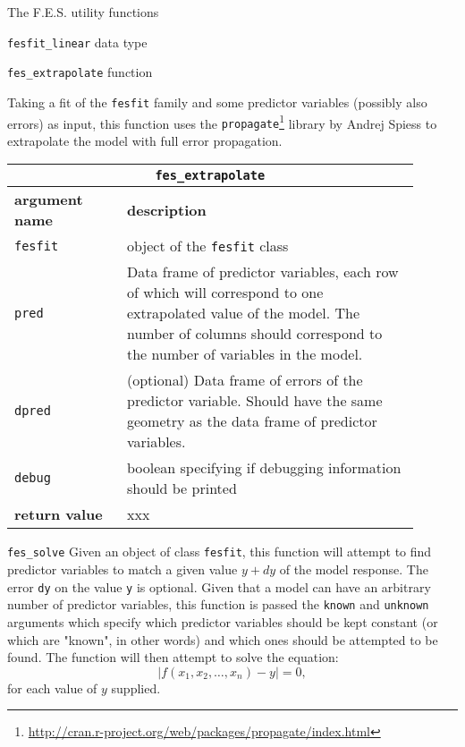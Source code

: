 \documentclass[10pt,a4paper]{article}
\begin{document}
\begin{section}{The F.E.S. utility functions}
\begin{subsection}{ {\tt fesfit\_linear} data type }
\end{subsection}

\begin{subsection}{ {\tt fes\_extrapolate} function }

Taking a fit of the {\tt fesfit} family and some predictor variables (possibly also errors) as input, this function uses the {\tt propagate}\footnote{\url{http://cran.r-project.org/web/packages/propagate/index.html}} library by Andrej Spiess to extrapolate the model with full error propagation.

{ \centering
\begin{tabular}{|p{0.25\linewidth}|p{0.65\linewidth}|}
\hline
\multicolumn{2}{|c|}{ {\tt fes\_extrapolate} } \\
\hline \hline \textbf{argument name} & \textbf{description} \\
\hline {\tt fesfit} & object of the {\tt fesfit} class \\ 
{\tt pred} & Data frame of predictor variables, each row of which will
correspond to one extrapolated value of the model. The number of columns should
correspond to the number of variables in the model. \\ 
{\tt dpred} & (optional) Data frame of errors of the predictor variable. Should
have the same geometry as the data frame of predictor variables. \\ 
{\tt debug} & boolean specifying if debugging information should be printed \\
\hline \hline
\textbf{return value} & xxx \\
\hline
\end{tabular}
}

\end{subsection}

\begin{subsection}{ {\tt fes\_solve} }
Given an object of class {\tt fesfit}, this function will attempt to find predictor variables to match a given value $y+dy$ of the model response.
The error {\tt dy} on the value {\tt y} is optional.
Given that a model can have an arbitrary number of predictor variables, this function is passed the {\tt known} and {\tt unknown} arguments which specify which predictor variables should be kept constant (or which are "known", in other words) and which ones should be attempted to be found. The function will then attempt to solve the equation:
\begin{equation}
	| f(x_1, x_2, \ldots , x_n) - y | = 0,
\end{equation}
for each value of $y$ supplied.


\end{subsection}
\end{section}
\end{document}
